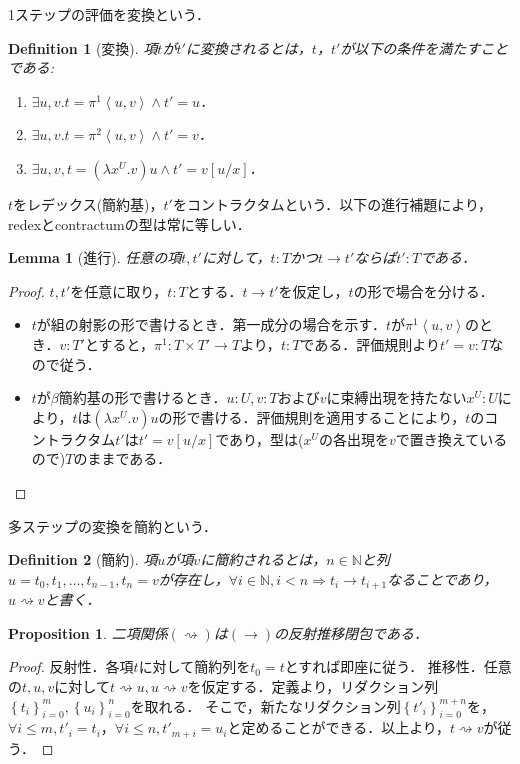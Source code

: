 \documentclass[a4paper,10pt,platex]{jsarticle}
\newtheorem{definition}{Definition}
\newtheorem{lemma}{Lemma}
\newtheorem{proposition}{Proposition}
\begin{document}
1ステップの評価を変換という．
\begin{definition}[変換]
項$t$が$t'$に変換されるとは，$t$，$t'$が以下の条件を満たすことである:\begin{enumerate}
\item $\exists u, v. t = \pi^{1}\left<u, v\right>\land t' = u$．
\item $\exists u, v. t = \pi^{2}\left<u, v\right>\land t' = v$．
\item $\exists u, v, t = (\lambda x^{U}.v) u \land t' = v\left[u/x\right]$．
\end{enumerate}
\end{definition}
$t$をレデックス(簡約基)，$t'$をコントラクタムという．以下の進行補題により，redexとcontractumの型は常に等しい．
\begin{lemma}[進行]
    任意の項$t, t'$に対して，$t: T$かつ$t\rightarrow t'$ならば$t' : T$である．
\end{lemma}
\begin{proof}
$t, t'$を任意に取り，$t:T$とする．$t\rightarrow t'$を仮定し，$t$の形で場合を分ける．
\begin{itemize}
    \item $t$が組の射影の形で書けるとき．第一成分の場合を示す．$t$が$\pi^{1}\left<u, v\right>$のとき．$v:T'$とすると，$\pi^{1}: T\times T'\rightarrow T$より，$t : T$である．評価規則より$t' = v : T$なので従う．
    \item $t$が$\beta$簡約基の形で書けるとき．$u: U, v: T$および$v$に束縛出現を持たない$x^{U}:U$により，$t$は$(\lambda x^{U}. v)u$の形で書ける．評価規則を適用することにより，$t$のコントラクタム$t'$は$t' = v\left[u/x\right]$であり，型は($x^{U}$の各出現を$v$で置き換えているので)$T$のままである．
\end{itemize}
\end{proof}
多ステップの変換を簡約という．
\begin{definition}[簡約]
項$u$が項$v$に簡約されるとは，$n\in\mathbb{N}$と列$u = t_{0}, t_{1},\ldots, t_{n- 1}, t_{n} = v$が存在し，$\forall i\in\mathbb{N}, i < n \Rightarrow t_{i}\rightarrow t_{i + 1}$なることであり，$u\rightsquigarrow v$と書く．
\end{definition}
\begin{proposition}
    二項関係$(\rightsquigarrow)$は$(\rightarrow)$の反射推移閉包である．
\end{proposition}
\begin{proof}
    反射性．各項$t$に対して簡約列を$t_{0} = t$とすれば即座に従う．
    推移性．任意の$t, u, v$に対して$t\rightsquigarrow u, u\rightsquigarrow v$を仮定する．定義より，リダクション列$\left\{t_{i}\right\}_{i = 0}^{m}, \left\{u_{i}\right\}_{i = 0}^{n}$を取れる．
    そこで，新たなリダクション列$\left\{t'_{i}\right\}_{i = 0}^{m+n}$を，$\forall i \leq m, t'_{i} = t_{i}$，$\forall i \leq n, t'_{m + i} = u_{i}$と定めることができる．以上より，$t\rightsquigarrow v$が従う．
\end{proof}
\end{document}
